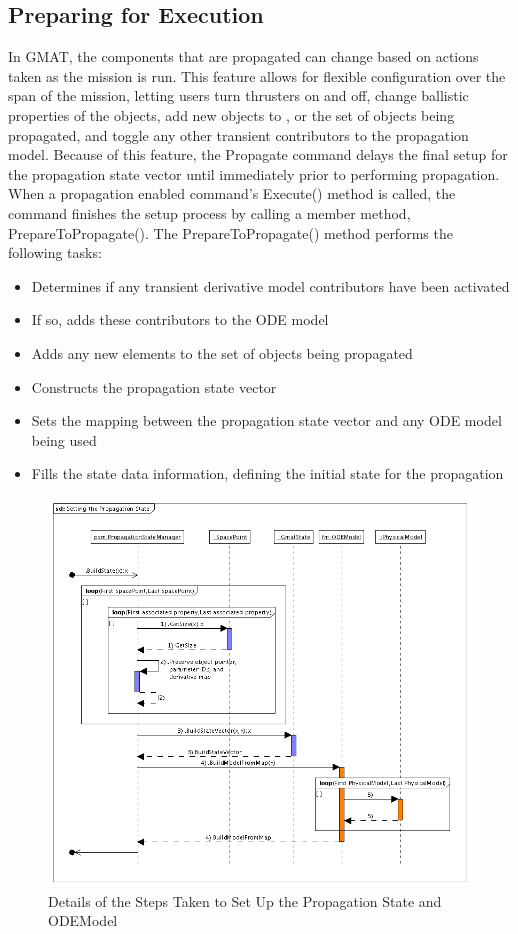 \documentclass[10pt]{article}
\begin{document}
\subsection{Preparing for Execution}

In GMAT, the components that are propagated can change based on actions taken as the mission is
run.  This feature allows for flexible configuration over the span of the mission, letting users
turn thrusters on and off, change ballistic properties of the objects, add new objects to , or
the set of objects being propagated, and toggle any other transient contributors to the
propagation model.  Because of this feature, the Propagate command delays the final setup for the
propagation state vector until immediately prior to performing propagation.  When a propagation
enabled command's Execute() method is called, the command finishes the setup process by calling a
member method, PrepareToPropagate(). The PrepareToPropagate() method performs the following tasks:

\begin{itemize}
\item Determines if any transient derivative model contributors have been activated
\item If so, adds these contributors to the ODE model
\item Adds any new elements to the set of objects being propagated
\item Constructs the propagation state vector
\item Sets the mapping between the propagation state vector and any ODE model being used
\item Fills the state data information, defining the initial state for the propagation
\end{itemize}


\begin{figure}[htb]
   \centering
   \includegraphics[380,335]{Images/SettingthePropagationState.png}
   \caption{Details of the Steps Taken to Set Up the Propagation State and ODEModel}
   \label{fig:P2PSetPropSate}
\end{figure}
\end{document}
